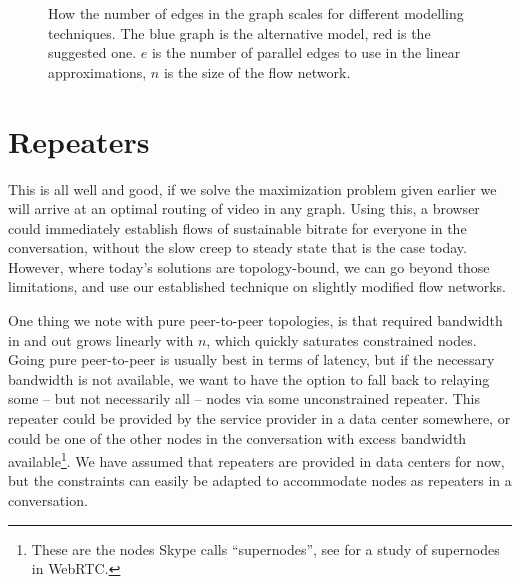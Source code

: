 \begin{figure}
    \centering
    \caption{How the number of edges in the graph scales for different modelling techniques. The blue graph is the alternative model, red is the suggested one. $e$ is the number of parallel edges to use in the linear approximations, $n$ is the size of the flow network.}
    \label{fig:model-scaling}
\end{figure}


\section{Repeaters}\label{sec:repeaters}

This is all well and good, if we solve the maximization problem given earlier we will arrive at an optimal routing of video in any graph. Using this, a browser could immediately establish flows of sustainable bitrate for everyone in the conversation, without the slow creep to steady state that is the case today. However, where today's solutions are topology-bound, we can go beyond those limitations, and use our established technique on slightly modified flow networks.

One thing we note with pure peer-to-peer topologies, is that required bandwidth in and out grows linearly with $n$, which quickly saturates constrained nodes. Going pure peer-to-peer is usually best in terms of latency, but if the necessary bandwidth is not available, we want to have the option to fall back to relaying some -- but not necessarily all -- nodes via some unconstrained repeater. This repeater could be provided by the service provider in a data center somewhere, or could be one of the other nodes in the conversation with excess bandwidth available\footnote{These are the nodes Skype calls ``supernodes'', see \cite{tree-topology-webrtc} for a study of supernodes in WebRTC.}. We have assumed that repeaters are provided in data centers for now, but the constraints can easily be adapted to accommodate nodes as repeaters in a conversation.

